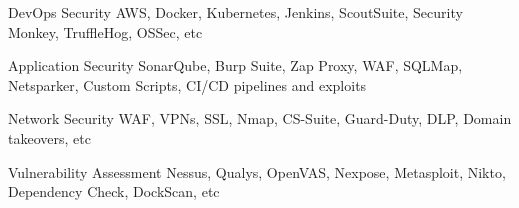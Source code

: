 
\begin{cvskills}

  \cvskill
    {DevOps Security} %
    {AWS, Docker, Kubernetes, Jenkins, ScoutSuite, Security Monkey, TruffleHog, OSSec, etc} %

  \cvskill
    {Application Security} %
    {SonarQube, Burp Suite, Zap Proxy, WAF, SQLMap, Netsparker, Custom Scripts, CI/CD pipelines  and exploits } %

  \cvskill
    {Network Security} %
    {WAF, VPNs, SSL, Nmap, CS-Suite, Guard-Duty, DLP, Domain takeovers, etc } %

  \cvskill
    {Vulnerability Assessment } %
    {Nessus, Qualys, OpenVAS, Nexpose, Metasploit, Nikto, Dependency Check, DockScan, etc } %

\end{cvskills}
